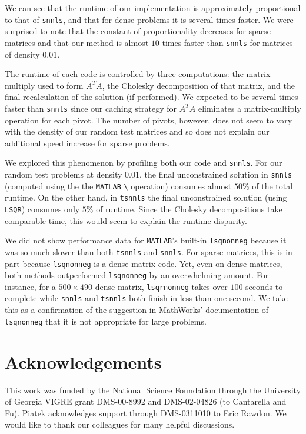 \documentclass[onecolumn,12pt,tightenlines,amsmath,secnumarabic,%
    floatfix,amssymb,aps,nofootinbib,letterpaper, showkeys]{revtex4}
\newcommand{\tsnnls}{\texttt{tsnnls} }
\newcommand{\snnls}{\texttt{snnls} }
\begin{document}
We can see that the runtime of our implementation is approximately proportional to that of \texttt{snnls}, and that for dense problems it is several times faster. We were surprised to note that the constant of proportionality decreases for sparse matrices and that our method is almost $10$ times faster than \snnls for matrices of density $0.01$. 

The runtime of each code is controlled by three computations: the matrix-multiply used to form $A^T\!A$, the Cholesky decomposition of that matrix, and the final recalculation of the solution (if performed). We expected to be several times faster than \snnls since our caching strategy for $A^T\!A$ eliminates a matrix-multiply operation for each pivot. The number of pivots, however, does not seem to vary with the density of our random test matrices and so does not explain our additional speed increase for sparse problems.

We explored this phenomenon by profiling both our code and \texttt{snnls}. For our random test problems at density $0.01$, the final unconstrained solution in \snnls (computed using the the \texttt{MATLAB} \verb=\= operation) consumes almost $50\%$ of the total runtime. On the other hand, in \tsnnls the final unconstrained solution (using \texttt{LSQR}) consumes only $5\%$ of runtime. Since the Cholesky decompositions take comparable time, this would seem to explain the runtime disparity.

We did not show performance data for \texttt{MATLAB}'s built-in \texttt{lsqnonneg} because it was so much slower than both \tsnnls and \texttt{snnls}. For sparse matrices, this is in part because \texttt{lsqnonneg} is a dense-matrix code. Yet, even on dense matrices, both methods outperformed \texttt{lsqnonneg} by an overwhelming amount. For instance, for a $500 \times 490$ dense matrix, \texttt{lsqrnonneg} takes over $100$ seconds to complete while \snnls and \tsnnls both finish in less than one second. We take this as a confirmation of the suggestion in MathWorks' documentation of \texttt{lsqnonneg} that it is not appropriate for large problems.

\section{Acknowledgements}

This work was funded by the National Science Foundation through the University of Georgia VIGRE grant DMS-00-8992 and DMS-02-04826 (to Cantarella and Fu). Piatek acknowledges support through DMS-0311010 to Eric Rawdon. We would like to thank our colleagues for many helpful discussions.

 
\end{document}
